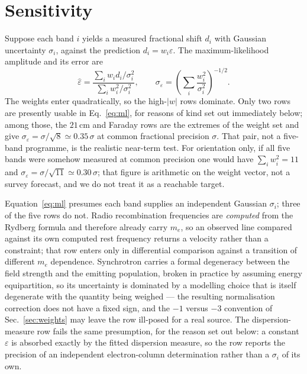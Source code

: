 \documentclass[aps,prd,twocolumn,superscriptaddress,nofootinbib,10pt]{revtex4-2}
\begin{document}
\section{Sensitivity}\label{sec:sens}

Suppose each band $i$ yields a measured fractional shift $d_i$ with Gaussian uncertainty
$\sigma_i$, against the prediction $d_i = w_i \varepsilon$. The maximum-likelihood amplitude and
its error are
%
\begin{equation}
  \hat{\varepsilon} = \frac{\sum_i w_i d_i / \sigma_i^{2}}{\sum_i w_i^{2}/\sigma_i^{2}},
  \qquad
  \sigma_{\varepsilon} = \left( \sum_i \frac{w_i^{2}}{\sigma_i^{2}} \right)^{-1/2}.
  \label{eq:ml}
\end{equation}
%
The weights enter quadratically, so the high-$|w|$ rows dominate. Only two rows are presently
usable in Eq.~\eqref{eq:ml}, for reasons of kind set out immediately below; among those, the
$21\,$cm and Faraday rows are the extremes of the weight set and give
$\sigma_{\varepsilon} = \sigma/\sqrt{8} \simeq 0.35\,\sigma$ at common fractional precision
$\sigma$. That pair, not a five-band programme, is the realistic near-term test. For orientation
only, if all five bands were somehow measured at common precision one would have
$\sum_i w_i^{2} = 11$ and $\sigma_{\varepsilon} = \sigma/\sqrt{11} \simeq 0.30\,\sigma$; that figure
is arithmetic on the weight vector, not a survey forecast, and we do not treat it as a reachable
target.

Equation~\eqref{eq:ml} presumes each band supplies an independent Gaussian $\sigma_i$; three of the
five rows do not. Radio recombination frequencies are \emph{computed} from the Rydberg formula and
therefore already carry $m_e$, so an observed line compared against its own computed rest frequency
returns a velocity rather than a constraint; that row enters only in differential comparison
against a transition of different $m_e$ dependence. Synchrotron carries a formal degeneracy between
the field strength and the emitting population, broken in practice by assuming energy equipartition,
so its uncertainty is dominated by a modelling choice that is itself degenerate with the quantity
being weighed --- the resulting normalisation correction does not have a fixed sign, and the
$-1$ versus $-3$ convention of Sec.~\ref{sec:weights} may leave the row ill-posed for a real
source. The dispersion-measure row fails the same presumption, for the reason set out below: a
constant $\varepsilon$ is absorbed exactly by the fitted dispersion measure, so the row reports the
precision of an independent electron-column determination rather than a $\sigma_i$ of its own.
\end{document}
